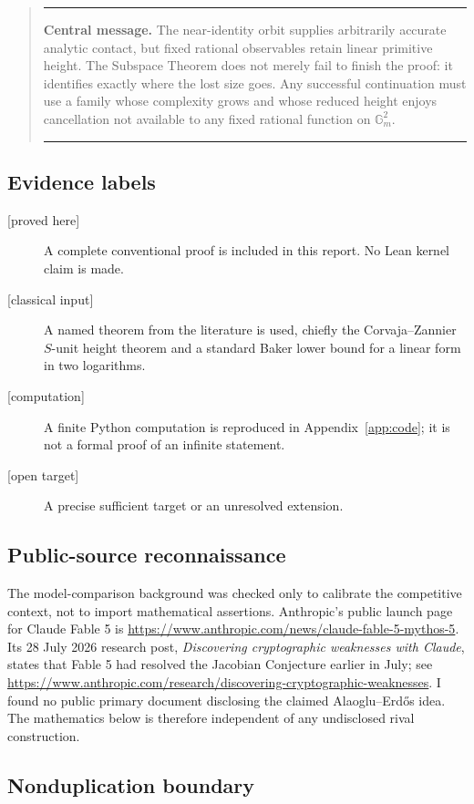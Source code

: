 \documentclass[11pt,oneside]{article}
\theoremstyle{definition}
\theoremstyle{remark}
\newcommand{\Gm}{\mathbb G_m}
\newcommand{\proved}{\textcolor{deepgreen}{\textsf{[proved here]}}}
\newcommand{\classical}{\textcolor{deepblue}{\textsf{[classical input]}}}
\newcommand{\computed}{\textcolor{deepviolet}{\textsf{[computation]}}}
\newcommand{\openstatus}{\textcolor{deepred}{\textsf{[open target]}}}
\newenvironment{resultbox}
 {\begin{quote}\hrule\smallskip\noindent}
 {\par\smallskip\hrule\end{quote}}
\begin{document}
\begin{resultbox}
\textbf{Central message.}
The near-identity orbit supplies arbitrarily accurate analytic contact, but fixed rational
observables retain linear primitive height.  The Subspace Theorem does not merely fail to
finish the proof: it identifies exactly where the lost size goes.  Any successful continuation
must use a family whose complexity grows and whose reduced height enjoys cancellation not
available to any fixed rational function on $\Gm^2$.
\end{resultbox}

\subsection{Evidence labels}

\begin{description}
\item[\proved] A complete conventional proof is included in this report.  No Lean kernel
claim is made.
\item[\classical] A named theorem from the literature is used, chiefly the
Corvaja--Zannier $S$-unit height theorem and a standard Baker lower bound for a linear form in
two logarithms.
\item[\computed] A finite Python computation is reproduced in Appendix~\ref{app:code}; it
is not a formal proof of an infinite statement.
\item[\openstatus] A precise sufficient target or an unresolved extension.
\end{description}

\subsection{Public-source reconnaissance}

The model-comparison background was checked only to calibrate the competitive context, not
to import mathematical assertions.  Anthropic's public launch page for Claude Fable 5 is
\url{https://www.anthropic.com/news/claude-fable-5-mythos-5}.  Its 28 July 2026 research
post, \emph{Discovering cryptographic weaknesses with Claude}, states that Fable 5 had
resolved the Jacobian Conjecture earlier in July; see
\url{https://www.anthropic.com/research/discovering-cryptographic-weaknesses}.  I found no
public primary document disclosing the claimed Alaoglu--Erd\H{o}s idea.  The mathematics below
is therefore independent of any undisclosed rival construction.

\subsection{Nonduplication boundary}
\end{document}
